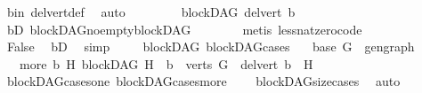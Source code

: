 \begin{isabellebody}
\ b{\isacharunderscore}{\kern0pt}in\ del{\isacharunderscore}{\kern0pt}vert{\isacharunderscore}{\kern0pt}def\ \isamarkupfalse%
\ auto\isanewline
\ \ \ \ \isamarkupfalse%
\ \isamarkupfalse%
\ {\isachardoublequoteopen}{\isasymnot}\ blockDAG\ {\isacharparenleft}{\kern0pt}del{\isacharunderscore}{\kern0pt}vert\ b{\isacharparenright}{\kern0pt}{\isachardoublequoteclose}\ \isamarkupfalse%
\ bD\ blockDAG{\isachardot}{\kern0pt}no{\isacharunderscore}{\kern0pt}empty{\isacharunderscore}{\kern0pt}blockDAG\isanewline
\ \ \ \ \ \ \isamarkupfalse%
\ {\isacharparenleft}{\kern0pt}metis\ less{\isacharunderscore}{\kern0pt}nat{\isacharunderscore}{\kern0pt}zero{\isacharunderscore}{\kern0pt}code{\isacharparenright}{\kern0pt}\ \isanewline
\ \ \ \ \isamarkupfalse%
\ \isamarkupfalse%
\ {\isachardoublequoteopen}False{\isachardoublequoteclose}\ \isamarkupfalse%
\ bD\ \isamarkupfalse%
\ simp\isanewline
\ \ \isamarkupfalse%
\isanewline
{}\isamarkupfalse%
%
\endisatagproof
{\isafoldproof}%
%
\isadelimproof
\isanewline
%
\endisadelimproof
\isanewline
{}\isamarkupfalse%
\ {\isacharparenleft}{\kern0pt}\ blockDAG{\isacharparenright}{\kern0pt}\ blockDAG{\isacharunderscore}{\kern0pt}cases{\isacharcolon}{\kern0pt}\isanewline
\ \ \ {\isacharparenleft}{\kern0pt}base{\isacharparenright}{\kern0pt}\ {\isachardoublequoteopen}{\isacharparenleft}{\kern0pt}G\ {\isacharequal}{\kern0pt}\ gen{\isacharunderscore}{\kern0pt}graph{\isacharparenright}{\kern0pt}{\isachardoublequoteclose}\isanewline
\ \ {\isacharbar}{\kern0pt}\ {\isacharparenleft}{\kern0pt}more{\isacharparenright}{\kern0pt}\ {\isachardoublequoteopen}{\isacharparenleft}{\kern0pt}{\isasymexists}b\ H{\isachardot}{\kern0pt}\ {\isacharparenleft}{\kern0pt}blockDAG\ H\ {\isasymand}\ b\ {\isasymin}\ verts\ G\ {\isasymand}\ del{\isacharunderscore}{\kern0pt}vert\ b\ {\isacharequal}{\kern0pt}\ H{\isacharparenright}{\kern0pt}{\isacharparenright}{\kern0pt}{\isachardoublequoteclose}\isanewline
%
\isadelimproof
\ \ %
\endisadelimproof
%
\isatagproof
{}\isamarkupfalse%
\ blockDAG{\isacharunderscore}{\kern0pt}cases{\isacharunderscore}{\kern0pt}one\ blockDAG{\isacharunderscore}{\kern0pt}cases{\isacharunderscore}{\kern0pt}more\isanewline
\ \ \ \ blockDAG{\isacharunderscore}{\kern0pt}size{\isacharunderscore}{\kern0pt}cases\ \isamarkupfalse%
\ auto%
\endisatagproof
{\isafoldproof}%
%
\isadelimproof
\isanewline

\end{isabellebody}
